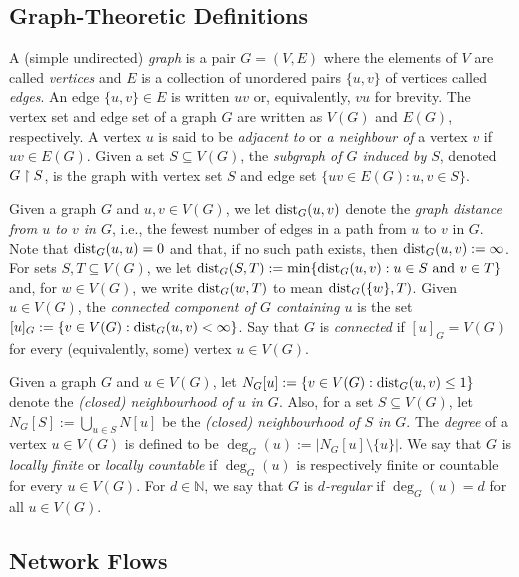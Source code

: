 \documentclass[12pt,a4paper]{amsart}
\numberwithin{equation}{section}
\theoremstyle{definition}
\begin{document}
\subsection{Graph-Theoretic Definitions}

A (simple undirected) \emph{graph} is a pair $G=(V,E)$ where the elements of $V$ are called \emph{vertices} and $E$ is a collection of unordered pairs $\{u,v\}$ of vertices called \emph{edges}. An edge $\{u,v\}\in E$ is written $uv$ or, equivalently, $vu$ for brevity.  The vertex set and edge set of a graph $G$ are written as $V(G)$ and $E(G)$, respectively. A vertex $u$ is said to be \emph{adjacent to} or \emph{a neighbour of} a vertex $v$ if $uv\in E(G)$. Given a set $S\subseteq V(G)$, the \emph{subgraph of $G$ induced by $S$}, denoted $G\upharpoonright S$, is the graph with vertex set $S$ and edge set $\{uv\in E(G): u,v\in S\}$.

Given a graph $G$ and $u,v\in V(G)$, we let $\operatorname{dist}_G(u,v)$ denote the \emph{graph distance from $u$ to $v$ in $G$}, i.e., the fewest number of edges in a path from $u$ to $v$ in $G$. Note that $\operatorname{dist}_G(u,u)=0$ and that, if no such path exists, then $\operatorname{dist}_G(u,v):=\infty$. For sets $S,T\subseteq V(G)$, we let $\operatorname{dist}_{G}(S,T):=\min\{\operatorname{dist}_G(u,v): u\in S\text{ and }v\in T\}$ and, for $w\in V(G)$, we write $\operatorname{dist}_G(w,T)$ to mean $\operatorname{dist}_G(\{w\},T)$. 
Given $u\in V(G)$, the \emph{connected component of $G$ containing $u$} is the set $[u]_G:=\{v\in V(G): \operatorname{dist}_G(u,v)<\infty\}$. Say that $G$ is \emph{connected} if $[u]_G=V(G)$ for every (equivalently, some) vertex $u\in V(G)$. 

Given a graph $G$ and $u\in V(G)$, let $N_G[u]:=\{v\in V(G): \operatorname{dist}_G(u,v)\leq 1\}$ denote the \emph{(closed) neighbourhood of $u$ in $G$}. Also, for a set $S\subseteq V(G)$, let $N_G[S]:=\bigcup_{u\in S}N[u]$ be the \emph{(closed) neighbourhood of $S$ in $G$}. The \emph{degree} of a vertex $u\in V(G)$ is defined to be $\deg_G(u):=\left|N_G[u]\setminus \{u\}\right|$. We say that $G$ is \emph{locally finite} or \emph{locally countable} if $\deg_G(u)$ is respectively finite or countable for every $u\in V(G)$. For $d\in \mathbb{N}$, we say that $G$ is \emph{$d$-regular} if $\deg_G(u)=d$ for all $u\in V(G)$.

\subsection{Network Flows}
\end{document}

